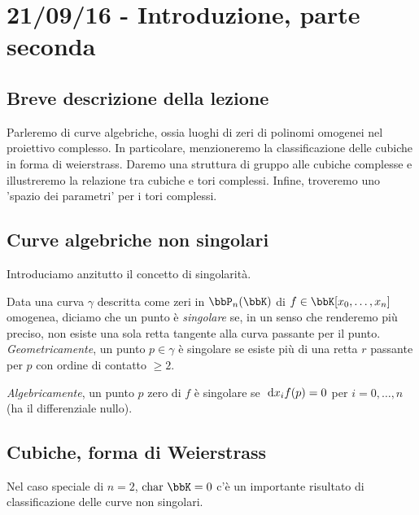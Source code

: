\chapter{21/09/16 - Introduzione, parte seconda}
\section{Breve descrizione della lezione}
Parleremo di curve algebriche, ossia luoghi di zeri di polinomi omogenei nel proiettivo complesso. In particolare, menzioneremo la classificazione delle cubiche in forma di weierstrass. Daremo una struttura di gruppo alle cubiche complesse e illustreremo la relazione tra cubiche e tori complessi. Infine, troveremo uno 'spazio dei parametri' per i tori complessi.
\section{Curve algebriche non singolari}

Introduciamo anzitutto il concetto di singolarità.

Data una curva $\gamma$ descritta come zeri in $\bbP_n(\bbK)$ di $f \in \bbK[x_0, \ldots,x_n]$ omogenea, diciamo che un punto è 
\textit{singolare} se, in un senso che renderemo più preciso, non esiste una sola retta tangente alla curva passante per il punto. \textit{Geometricamente}, un punto $p \in \gamma$ è singolare se esiste più di una retta $r$ passante per $p$ con ordine di contatto $\geq 2$. 
\vspace{1em}


\textit{Algebricamente}, un punto $p$ zero di $f$ è singolare se $\text{ d}{x_i}f(p)=0$ per $i=0,\ldots,n$ (ha il differenziale nullo). 


\section{Cubiche, forma di Weierstrass}
Nel caso speciale di $n=2$, $\chr \bbK = 0$ c'è un importante risultato di classificazione delle curve non singolari. 

